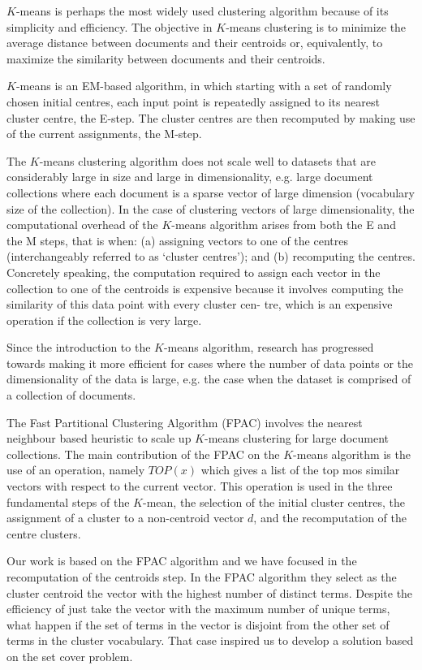\documentclass[runningheads]{llncs}
\begin{document}
$K$-means is perhaps the most widely used clustering algorithm
because of its simplicity and efficiency. The objective in $K$-means clustering is to minimize the average distance between documents and their
centroids or, equivalently, to maximize the similarity between documents
and their centroids.

$K$-means is an EM-based algorithm, in which starting with a set of randomly 
chosen initial centres, each input point is repeatedly assigned to its
nearest cluster centre, the E-step. The cluster centres are then recomputed by making use of the current assignments, the M-step.


The $K$-means clustering algorithm
does not scale well to datasets that are considerably large in size
and large in dimensionality, e.g. large document collections where
each document is a sparse vector of large dimension (vocabulary
size of the collection).
In the case of clustering vectors of large
dimensionality, the computational overhead of the $K$-means algorithm arises from both the E and the M steps, that is when: (a)
assigning vectors to one of the centres (interchangeably referred to
as ‘cluster centres’); and (b) recomputing the centres. Concretely
speaking, the computation required to assign each vector in the
collection to one of the centroids is expensive because it involves
computing the similarity of this data point with every cluster cen-
tre, which is an expensive operation if the collection is very large.

Since the introduction to the $K$-means algorithm, research
has progressed towards making it more efficient for cases where
the number of data points or the dimensionality of the data is
large, e.g. the case when the dataset is comprised of a collection
of documents.

The Fast Partitional Clustering Algorithm (FPAC) \cite{ganguly_2018}
involves the nearest neighbour based heuristic to
scale up $K$-means clustering for large document collections.
The main contribution of the FPAC on the $K$-means algorithm
is the use of an operation, namely $TOP(x)$ which gives a list
of the top mos similar vectors with respect to the current vector.
This operation is used in the three fundamental steps of the 
$K$-mean, the selection of the initial cluster centres,
the assignment of a cluster to a non-centroid vector $d$, and 
the recomputation of the centre clusters.

Our work is based on the FPAC algorithm and we have focused in the recomputation of the centroids step.
In the FPAC algorithm they select as the cluster centroid the 
vector with the highest number of distinct terms. Despite the efficiency
of just take the vector with the maximum number of unique terms,
what happen if the set of terms in the vector is disjoint from 
the other set of terms in the cluster vocabulary. That 
case inspired us to develop a solution based on the set cover problem.
\end{document}
